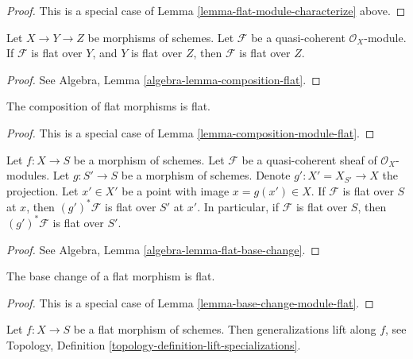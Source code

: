 \begin{proof}
This is a special case of Lemma \ref{lemma-flat-module-characterize}
above.
\end{proof}

\begin{lemma}
\label{lemma-composition-module-flat}
Let $X \to Y \to Z$ be morphisms of schemes.
Let $\mathcal{F}$ be a quasi-coherent $\mathcal{O}_X$-module.
If $\mathcal{F}$ is flat over $Y$, and $Y$ is flat over $Z$, then
$\mathcal{F}$ is flat over $Z$.
\end{lemma}

\begin{proof}
See Algebra, Lemma \ref{algebra-lemma-composition-flat}.
\end{proof}

\begin{lemma}
\label{lemma-composition-flat}
The composition of flat morphisms is flat.
\end{lemma}

\begin{proof}
This is a special case of Lemma \ref{lemma-composition-module-flat}.
\end{proof}

\begin{lemma}
\label{lemma-base-change-module-flat}
Let $f : X \to S$ be a morphism of schemes.
Let $\mathcal{F}$ be a quasi-coherent sheaf of $\mathcal{O}_X$-modules.
Let $g : S' \to S$ be a morphism of schemes.
Denote $g' : X' = X_{S'} \to X$ the projection.
Let $x' \in X'$ be a point with image $x = g(x') \in X$.
If $\mathcal{F}$ is flat over $S$ at $x$, then
$(g')^*\mathcal{F}$ is flat over $S'$ at $x'$.
In particular, if $\mathcal{F}$ is flat over $S$, then
$(g')^*\mathcal{F}$ is flat over $S'$.
\end{lemma}

\begin{proof}
See Algebra, Lemma \ref{algebra-lemma-flat-base-change}.
\end{proof}

\begin{lemma}
\label{lemma-base-change-flat}
The base change of a flat morphism is flat.
\end{lemma}

\begin{proof}
This is a special case of Lemma \ref{lemma-base-change-module-flat}.
\end{proof}

\begin{lemma}
\label{lemma-generalizations-lift-flat}
Let $f : X \to S$ be a flat morphism of schemes.
Then generalizations lift along $f$, see
Topology, Definition \ref{topology-definition-lift-specializations}.
\end{lemma}

